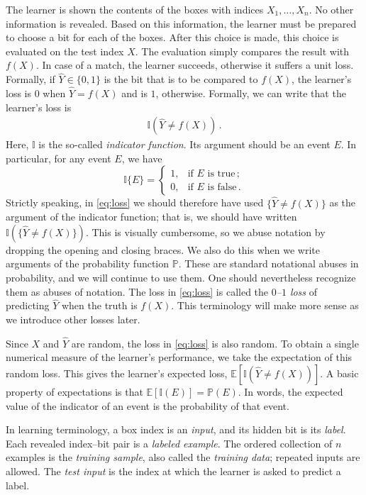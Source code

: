 \documentclass[11pt,twoside]{article}
\newcommand{\I}{\mathbb I}
\renewcommand{\P}{\mathbb P}
\theoremstyle{definition}
\theoremstyle{remark}
\begin{document}
The learner is shown the contents of the boxes with indices $X_1,\dots,X_n$.
No other information is revealed.
Based on this information, the learner must be prepared to
choose a bit for each of the boxes.
After this choice is made, this choice is evaluated on the
test index $X$. The evaluation simply compares the result with $f(X)$.
In case of a match, the learner succeeds, otherwise it suffers a unit loss.
Formally, if $\hat Y\in \{0,1\}$ is the bit that is to be compared to $f(X)$,
the learner's loss is $0$ when $\hat Y = f(X)$ and is $1$, otherwise.
Formally, we can write that the learner's loss is
\begin{align}
\I( \hat Y \ne f(X) )\,. \label{eq:loss}
\end{align}
Here, $\I$ is the so-called \emph{indicator function}. Its argument should be
an event $E$. In particular, for any event $E$, we have
\[
\I\{E\}=\begin{cases}
1,&\text{if $E$ is true}\,;\\
0,&\text{if $E$ is false}\,.
\end{cases}
\]
Strictly speaking, in \cref{eq:loss} we should therefore have used
$\{\hat Y \ne f(X)\}$ as the argument of the indicator function; that is, we
should have written $\I(\{\hat Y \ne f(X)\})$. This is visually
cumbersome, so we abuse notation by dropping the opening and closing braces.
We also do this when we write arguments
of the probability function $\P$. These are standard notational abuses
in probability, and we will continue to use them. One should nevertheless
recognize them as abuses of notation.
The loss in \cref{eq:loss} is called the \emph{$0$--$1$ loss} of predicting $\hat Y$ when the truth is $f(X)$.
This terminology will make more sense as we introduce other losses later.

Since $X$ and $\hat Y$ are random, the loss in \cref{eq:loss} is also random.
To obtain a single numerical measure of the learner's performance, we take the
expectation of this random loss. This gives the learner's expected loss,
$\mathbb E[\I(\hat Y \ne f(X))]$.
A basic property of expectations is that $\mathbb E[\mathbb{I}(E)] = \P(E)$. In words, the expected
value of the indicator of an event is the probability of that event.

In learning terminology, a box index is an \emph{input}, and its hidden bit is
its \emph{label}. Each revealed index--bit pair is a \emph{labeled example}.
The ordered collection of $n$ examples is the \emph{training sample}, also
called the \emph{training data}; repeated inputs are allowed. The \emph{test input}
is the index at which the learner is asked to predict a label.
\end{document}
